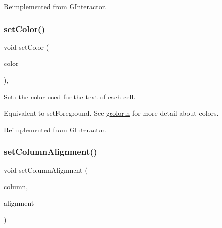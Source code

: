 Reimplemented from \mbox{\hyperlink{classsgl_1_1GInteractor_ab1f5cc0f5cc6bbbd716a526c61f1081d}{G\+Interactor}}.

\mbox{\label{classsgl_1_1GTable_a56845b1accc47aa881d05939eef6996c}} 
\subsubsection{\texorpdfstring{set\+Color()}{setColor()}\hspace{0.1cm}{\footnotesize\ttfamily [2/2]}}
{\footnotesize\ttfamily void set\+Color (\begin{DoxyParamCaption}\item[{const std\+::string \&}]{color }\end{DoxyParamCaption})\hspace{0.3cm}{\ttfamily [override]}, {\ttfamily [virtual]}}



Sets the color used for the text of each cell. 

Equivalent to set\+Foreground. See \mbox{\hyperlink{gcolor_8h_source}{gcolor.\+h}} for more detail about colors. 

Reimplemented from \mbox{\hyperlink{classsgl_1_1GInteractor_a61374df6c11b52cfbb0815decdbaebc6}{G\+Interactor}}.

\mbox{\label{classsgl_1_1GTable_a84b3f42bb5d010483b78b9fd7e9c55f0}} 
\subsubsection{\texorpdfstring{set\+Column\+Alignment()}{setColumnAlignment()}}
{\footnotesize\ttfamily void set\+Column\+Alignment (\begin{DoxyParamCaption}\item[{int}]{column,  }\item[{\mbox{\hyperlink{namespacesgl_aa00e70829e72ff16addc4d9f06fe3bc5}{Horizontal\+Alignment}}}]{alignment }\end{DoxyParamCaption})\hspace{0.3cm}{\ttfamily [virtual]}}



